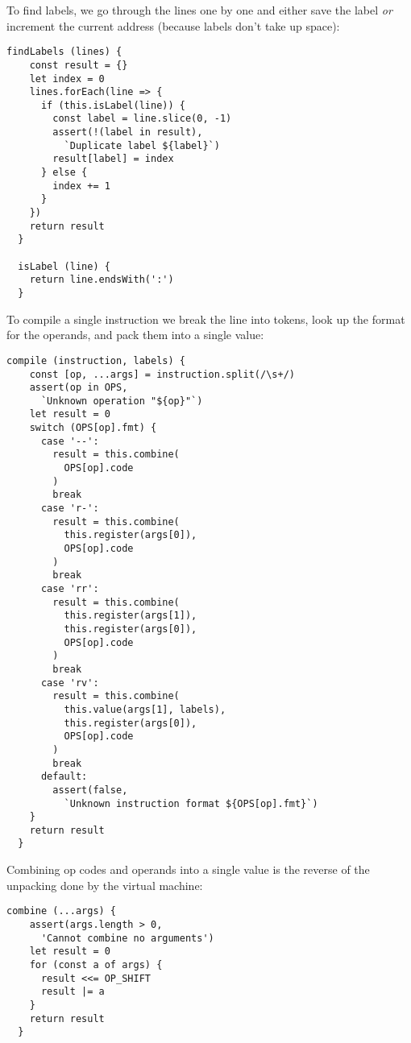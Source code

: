 \documentclass[krantzl]{krantz}
\begin{document}
To find labels,
we go through the lines one by one
and either save the label \emph{or} increment the current address
(because labels don’t take up space):


\begin{lstlisting}[frame=tblr]
  findLabels (lines) {
    const result = {}
    let index = 0
    lines.forEach(line => {
      if (this.isLabel(line)) {
        const label = line.slice(0, -1)
        assert(!(label in result),
          `Duplicate label ${label}`)
        result[label] = index
      } else {
        index += 1
      }
    })
    return result
  }

  isLabel (line) {
    return line.endsWith(':')
  }
\end{lstlisting}



To compile a single instruction we break the line into tokens,
look up the format for the operands,
and pack them into a single value:


\begin{lstlisting}[frame=tblr]
  compile (instruction, labels) {
    const [op, ...args] = instruction.split(/\s+/)
    assert(op in OPS,
      `Unknown operation "${op}"`)
    let result = 0
    switch (OPS[op].fmt) {
      case '--':
        result = this.combine(
          OPS[op].code
        )
        break
      case 'r-':
        result = this.combine(
          this.register(args[0]),
          OPS[op].code
        )
        break
      case 'rr':
        result = this.combine(
          this.register(args[1]),
          this.register(args[0]),
          OPS[op].code
        )
        break
      case 'rv':
        result = this.combine(
          this.value(args[1], labels),
          this.register(args[0]),
          OPS[op].code
        )
        break
      default:
        assert(false,
          `Unknown instruction format ${OPS[op].fmt}`)
    }
    return result
  }
\end{lstlisting}



Combining op codes and operands into a single value
is the reverse of the unpacking done by the virtual machine:


\begin{lstlisting}[frame=tblr]
  combine (...args) {
    assert(args.length > 0,
      'Cannot combine no arguments')
    let result = 0
    for (const a of args) {
      result <<= OP_SHIFT
      result |= a
    }
    return result
  }
\end{lstlisting}
\end{document}
